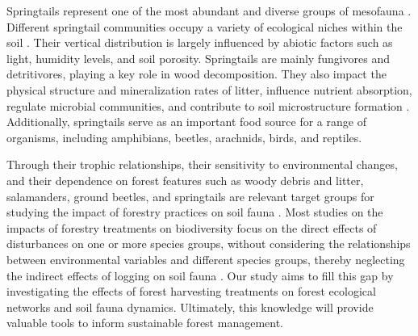 Springtails represent one of the most abundant and diverse groups of mesofauna \citep{rusekBiodiversityCollembolaTheir1998}. 
Different springtail communities occupy a variety of ecological niches within the soil \citep{pongeVerticalDistributionCollembola2000}. 
Their vertical distribution is largely influenced by abiotic factors such as light, humidity levels, and soil porosity. 
Springtails are mainly fungivores and detritivores, playing a key role in wood decomposition. 
They also impact the physical structure and mineralization rates of litter, influence nutrient absorption, 
regulate microbial communities, and contribute to soil microstructure formation \citep{Petersen1982comparativeanalysis,Neher2012Linkinginvertebrate,Maass2015Functionalrole,Potapov2016Connectingtaxonomy}. 
Additionally, springtails serve as an important food source for a range of organisms, including amphibians, beetles, arachnids, birds, and reptiles.

Through their trophic relationships, their sensitivity to environmental changes, and their dependence on forest features such as woody debris and litter, 
salamanders, ground beetles, and springtails are relevant target groups for studying the impact of forestry practices on soil fauna \citep{Salmon2008Relationshipssoil}. 
Most studies on the impacts of forestry treatments on biodiversity focus on the direct effects of disturbances on one or more species groups, 
without considering the relationships between environmental variables and different species groups, thereby neglecting the indirect effects of logging on soil fauna \citep{josephIntegratingOccupancyModels2016,Pollierer2021Diversityfunctional,Kudrin2023metaanalysiseffects}. 
Our study aims to fill this gap by investigating the effects of forest harvesting treatments on forest ecological networks and soil fauna dynamics. 
Ultimately, this knowledge will provide valuable tools to inform sustainable forest management.

